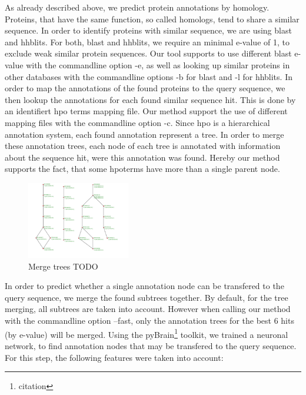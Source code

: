 As already described above, we predict protein annotations by homology. Proteins, that have the same function, so called homologs, tend to share a similar sequence. In order to identify proteins
with similar sequence, we are using blast and hhblits. For both, blast and hhblits, we require an minimal e-value of 1, to exclude weak similar protein sequences. Our tool supports to use
different blast e-value with the commandline option -e, as well as looking up similar proteins in other databases with the commandline options -b for blast and -l for hhblits.\newline
In order to map the annotations of the found proteins to the query sequence, we then lookup the annotations for each found similar sequence hit. This is done by an identifiert hpo terms mapping file.
Our method support the use of different mapping files with the commandline option -c.\newline
Since hpo is a hierarchical annotation system, each found annotation represent a tree. In order to merge these annotation trees, each node of each tree is annotated with information about the sequence
hit, were this annotation was found. Hereby our method supports the fact, that some hpoterms have more than a single parent node.\newline
\begin{figure}[!hb]
\includegraphics[width = 0.4\textwidth]{figures/merge_trees.png}
\caption{Merge trees TODO}
\label{fig:function_transfer}
\end{figure}
In order to predict whether a single annotation node can be transfered to the query sequence, we merge
the found subtrees together. By default, for the tree merging, all subtrees are taken into account.
However when calling our method with the commandline option --fast, only the annotation trees for the 
best 6 hits (by e-value) will be merged.\newline
Using the pyBrain\footnote{citation} toolkit, we trained a neuronal network, to find annotation nodes
that may be transfered to the query sequence. For this step, the following features were taken into
account:\newline
